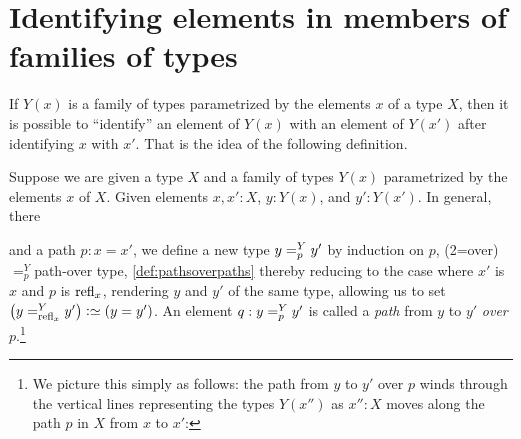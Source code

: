 \section{Identifying elements in members of families of types}

If $Y(x)$ is a family of types parametrized by the elements $x$ of a type $X$, then it is possible to ``identify'' an element of $Y(x)$ with an
element of $Y(x')$ after identifying $x$ with $x'$.  That is the idea of the following definition.

\begin{definition}\label{def:pathsoverpaths}
  Suppose we are given a type $X$ and a family of types $Y(x)$ parametrized by the elements $x$ of $X$.  Given elements $x,x':X$, $y:Y(x)$, and
  $y':Y(x')$.  In general, there

 and a path $p : x = x'$,
  we define a new type $\pathover y Y p {y'}$ by induction on $p$,%
  \glossary(2=over){$=^Y_p$}{path-over type, \cref{def:pathsoverpaths}}
  thereby reducing to the case
  where $x'$ is $x$ and $p$ is $\mathrm{refl}_{x}$,
  rendering $y$ and $y'$ of the same type,
  allowing us to set
  $\left( \pathover y Y {\refl x} {y'} \right) \defeq (y = y')$.
  An element $q : \pathover y Y p {y'}$ is called a \emph{path} from $y$ to $y'$ \emph{over} $p$.\footnote{\label{ft:path-over-pic}%
    We picture this simply as follows: the path from $y$ to $y'$ over $p$ winds
    through the vertical lines representing the types $Y(x'')$ as $x'':X$
    moves along the path $p$ in $X$ from $x$ to $x'$:\par
  }
\end{definition}
